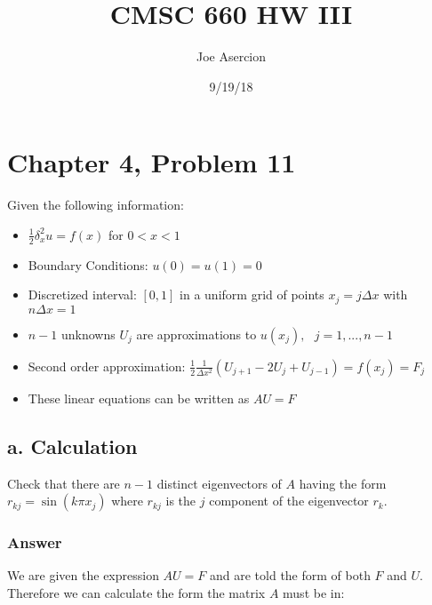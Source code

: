 \documentclass{article}
\title{CMSC 660 HW III}
\date{9/19/18}
\author{Joe Asercion}
\newcommand{\n}{\newline}
\begin{document}
	\maketitle
	\section{Chapter 4, Problem 11}
	Given the following information:
	\begin{itemize}
		\item $\frac{1}{2}\delta_{x}^{2}u=f(x)$ for $0<x<1$ 
		\item Boundary Conditions: $u(0)=u(1)=0$
		\item Discretized interval: $[0,1]$ in a uniform grid of points $x_{j}=j\Delta x$ with $n\Delta x=1$
		\item  $n-1$ unknowns $U_{j}$ are approximations to $u(x_{j}),\text{ }j=1,...,n-1$
		\item Second order approximation: $\frac{1}{2}\frac{1}{\Delta x^{2}}(U_{j+1}-2U_{j}+U_{j-1})=f(x_j)=F_j$\\
		\item These linear equations can be written as $AU=F$
	\end{itemize}
	\subsection{a. Calculation}
	Check that there are $n-1$ distinct eigenvectors of $A$ having the form $r_{kj}=\sin(k\pi x_{j})$ where $r_{kj}$ is the $j$ component of the eigenvector $r_{k}$.
	\subsubsection{Answer}
	
	We are given the expression $AU=F$ and are told the form of both $F$ and $U$.  Therefore we can calculate the form the matrix $A$ must be in: \n
	
\end{document}
